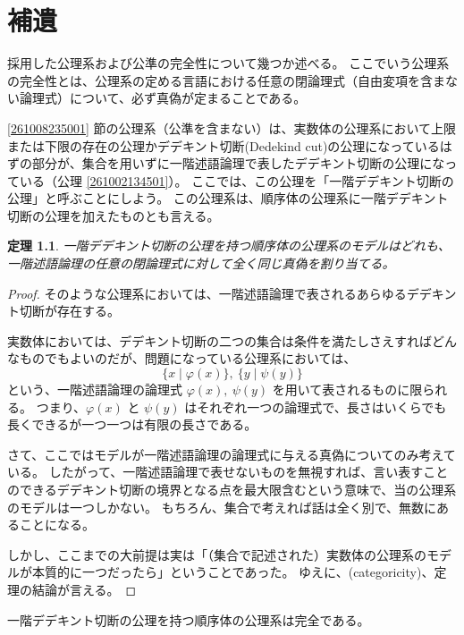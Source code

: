 \chapter{補遺}


\setcounter{chapter}{0}
\newtheorem{thm2}{定理}[chapter]

採用した公理系および公準の完全性について幾つか述べる。
ここでいう公理系の完全性とは、公理系の定める言語における任意の閉論理式（自由変項を含まない論理式）について、必ず真偽が定まることである。

\ref{261008235001} 節の公理系（公準を含まない）は、実数体の公理系において上限または下限の存在の公理かデデキント切断(Dedekind cut)の公理になっているはずの部分が、集合を用いずに一階述語論理で表したデデキント切断の公理になっている（公理 \ref{261002134501}）。
ここでは、この公理を「一階デデキント切断の公理」と呼ぶことにしよう。
この公理系は、順序体の公理系に一階デデキント切断の公理を加えたものとも言える。


\begin{thm2}
  一階デデキント切断の公理を持つ順序体の公理系のモデルはどれも、一階述語論理の任意の閉論理式に対して全く同じ真偽を割り当てる。
\end{thm2}

\begin{proof}
  そのような公理系においては、一階述語論理で表されるあらゆるデデキント切断が存在する。

  実数体においては、デデキント切断の二つの集合は条件を満たしさえすればどんなものでもよいのだが、問題になっている公理系においては、
  \[\{x\mid\varphi(x)\},\ \{y\mid\psi(y)\}\]
  という、一階述語論理の論理式 \(\varphi(x),\ \psi(y)\) を用いて表されるものに限られる。
  つまり、\(\varphi(x)\) と \(\psi(y)\) はそれぞれ一つの論理式で、長さはいくらでも長くできるが一つ一つは有限の長さである。

  さて、ここではモデルが一階述語論理の論理式に与える真偽についてのみ考えている。
  したがって、一階述語論理で表せないものを無視すれば、言い表すことのできるデデキント切断の境界となる点を最大限含むという意味で、当の公理系のモデルは一つしかない。
  もちろん、集合で考えれば話は全く別で、無数にあることになる。

  しかし、ここまでの大前提は実は「（集合で記述された）実数体の公理系のモデルが本質的に一つだったら」ということであった。
  ゆえに、(categoricity)、定理の結論が言える。
\end{proof}

\begin{col*}
  一階デデキント切断の公理を持つ順序体の公理系は完全である。
\end{col*}

